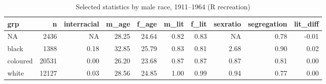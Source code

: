 \begin{table}

\caption{Selected statistics by male race, 1911--1964 (R recreation)}
\centering
\begin{tabular}[t]{lrrrrrrrrr}
\toprule
grp & n & interracial & m\_age & f\_age & m\_lit & f\_lit & sexratio & segregation & lit\_diff\\
\midrule
NA & 2436 & NA & 28.25 & 24.64 & 0.82 & 0.83 & NA & 0.78 & -0.01\\
black & 1388 & 0.18 & 32.85 & 25.79 & 0.83 & 0.81 & 2.68 & 0.90 & 0.02\\
coloured & 20531 & 0.00 & 26.20 & 23.68 & 0.87 & 0.87 & 0.87 & 0.81 & 0.00\\
white & 12127 & 0.03 & 28.56 & 24.85 & 1.00 & 0.99 & 0.94 & 0.77 & 0.00\\
\bottomrule
\end{tabular}
\end{table}
